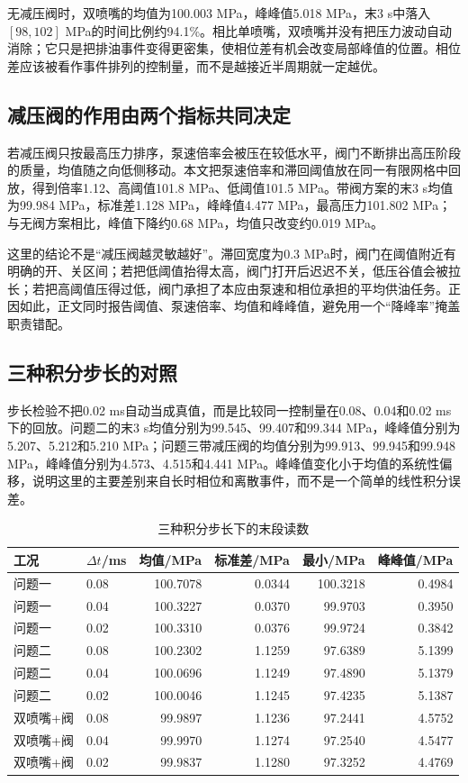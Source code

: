 \documentclass[UTF8,11pt,a4paper]{ctexart}
\begin{document}
无减压阀时，双喷嘴的均值为100.003 MPa，峰峰值5.018 MPa，末3 s中落入$[98,102]$ MPa的时间比例约94.1\%。相比单喷嘴，双喷嘴并没有把压力波动自动消除；它只是把排油事件变得更密集，使相位差有机会改变局部峰值的位置。相位差应该被看作事件排列的控制量，而不是越接近半周期就一定越优。

\subsection{减压阀的作用由两个指标共同决定}

若减压阀只按最高压力排序，泵速倍率会被压在较低水平，阀门不断排出高压阶段的质量，均值随之向低侧移动。本文把泵速倍率和滞回阈值放在同一有限网格中回放，得到倍率1.12、高阈值101.8 MPa、低阈值101.5 MPa。带阀方案的末3 s均值为99.984 MPa，标准差1.128 MPa，峰峰值4.477 MPa，最高压力101.802 MPa；与无阀方案相比，峰值下降约0.68 MPa，均值只改变约0.019 MPa。

这里的结论不是“减压阀越灵敏越好”。滞回宽度为0.3 MPa时，阀门在阈值附近有明确的开、关区间；若把低阈值抬得太高，阀门打开后迟迟不关，低压谷值会被拉长；若把高阈值压得过低，阀门承担了本应由泵速和相位承担的平均供油任务。正因如此，正文同时报告阈值、泵速倍率、均值和峰峰值，避免用一个“降峰率”掩盖职责错配。

\subsection{三种积分步长的对照}

步长检验不把0.02 ms自动当成真值，而是比较同一控制量在0.08、0.04和0.02 ms下的回放。问题二的末3 s均值分别为99.545、99.407和99.344 MPa，峰峰值分别为5.207、5.212和5.210 MPa；问题三带减压阀的均值分别为99.913、99.945和99.948 MPa，峰峰值分别为4.573、4.515和4.441 MPa。峰峰值变化小于均值的系统性偏移，说明这里的主要差别来自长时相位和离散事件，而不是一个简单的线性积分误差。

\begin{table}[H]
\centering
\caption{三种积分步长下的末段读数}
\label{tab:step-convergence-a}
\small
\begin{tabular}{llrrrr}
\toprule
工况 & $\Delta t$/ms & 均值/MPa & 标准差/MPa & 最小/MPa & 峰峰值/MPa\\
\midrule
问题一 & 0.08 & 100.7078 & 0.0344 & 100.3218 & 0.4984\\
问题一 & 0.04 & 100.3227 & 0.0370 & 99.9703 & 0.3950\\
问题一 & 0.02 & 100.3310 & 0.0376 & 99.9724 & 0.3842\\
问题二 & 0.08 & 100.2302 & 1.1259 & 97.6389 & 5.1399\\
问题二 & 0.04 & 100.0696 & 1.1249 & 97.4890 & 5.1379\\
问题二 & 0.02 & 100.0046 & 1.1245 & 97.4235 & 5.1387\\
双喷嘴+阀 & 0.08 & 99.9897 & 1.1236 & 97.2441 & 4.5752\\
双喷嘴+阀 & 0.04 & 99.9970 & 1.1274 & 97.2540 & 4.5477\\
双喷嘴+阀 & 0.02 & 99.9837 & 1.1280 & 97.3252 & 4.4769\\
\bottomrule
\end{tabular}
\end{table}
\end{document}
